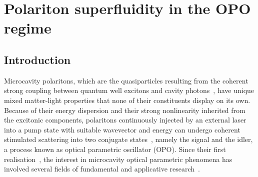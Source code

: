 

\chapter{Polariton superfluidity in the OPO regime}
\label{cha:opo}






\section{Introduction}
%
Microcavity polaritons, which are the quasiparticles resulting from
the coherent strong coupling between quantum well excitons and cavity
photons~\cite{9780199228942}, have unique mixed matter-light
properties that none of their constituents display on its own. Because
of their energy dispersion and their strong nonlinearity inherited
from the excitonic components, polaritons continuously injected by an
external laser into a pump state with suitable wavevector and energy
can undergo coherent stimulated scattering into two conjugate
states~\cite{Ciuti_2000,Ciuti_2001,Ciuti_2003}, namely the signal and
the idler, a process known as optical parametric oscillator (OPO).
%
Since their first
realisation~\cite{Stevenson_2000,Savvidis_2000,Savvidis_2000_b,Baumberg_2000,Saba_2001},
the interest in microcavity optical parametric phenomena has involved
several fields of fundamental and applicative
research~\cite{Edamatsu_2004,Savasta_2005,Lanco_2006,Abbarchi_2011,Ardizzone_2012,Xie_2012,Lecomte_2013}.

